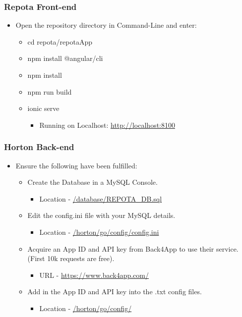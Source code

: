 \newpage
\subsubsection{Repota Front-end}
\begin{itemize}
  \item Open the repository directory in Command-Line and enter:
    \begin{itemize}
    \item cd repota/repotaApp
    \item npm install @angular/cli
    \item npm install
    \item npm run build
    \item ionic serve
    \begin{itemize}
        \item Running on Localhost: \url{http://localhost:8100}
    \end{itemize}
    \end{itemize}
\end{itemize}

\subsubsection{Horton Back-end}
\begin{itemize}
  \item Ensure the following have been fulfilled:
    \begin{itemize}
    \item Create the Database in a MySQL Console.
        \begin{itemize}
            \item Location - \url{/database/REPOTA_DB.sql}
        \end{itemize}
    \item Edit the config.ini file with your MySQL details.
        \begin{itemize}
            \item Location - \url{/horton/go/config/config.ini}
        \end{itemize}
    \item Acquire an App ID and API key from Back4App to use their service. (First 10k requests are free).
        \begin{itemize}
            \item URL - \url{https://www.back4app.com/}
        \end{itemize}
    \item Add in the App ID and API key into the .txt config files.
        \begin{itemize}
            \item Location - \url{/horton/go/config/}
        \end{itemize}
    \end{itemize}
\end{itemize}

